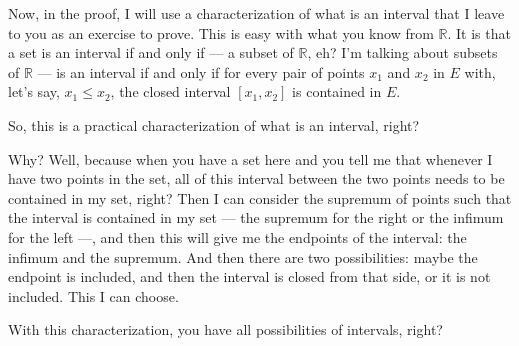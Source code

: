 \begin{speech}[00:03:33 - 00:05:32]
Now, in the proof, I will use a characterization of what is an interval that I leave to you as an exercise to prove. This is easy with what you know from $\mathbb{R}$. It is that a set is an interval if and only if --- a subset of $\mathbb{R}$, eh? I'm talking about subsets of $\mathbb{R}$ --- is an interval if and only if  for every pair of points $x_1$ and $x_2$ in $E$ with, let's say, $x_1 \le x_2$, the closed interval $[x_1, x_2]$ is contained in $E$.

So, this is a practical characterization of what is an interval, right?

Why? Well, because when you have a set here  and you tell me that whenever I have two points in the set, all of this interval between the two points needs to be contained in my set, right? Then I can consider the supremum of points such that the interval is contained in my set --- the supremum for the right or the infimum for the left ---, and then this will give me the endpoints of the interval: the infimum and the supremum. And then there are two possibilities: maybe the endpoint is included, and then the interval is closed from that side, or it is not included. This I can choose.

With this characterization, you have all possibilities of intervals, right?
\end{speech}

